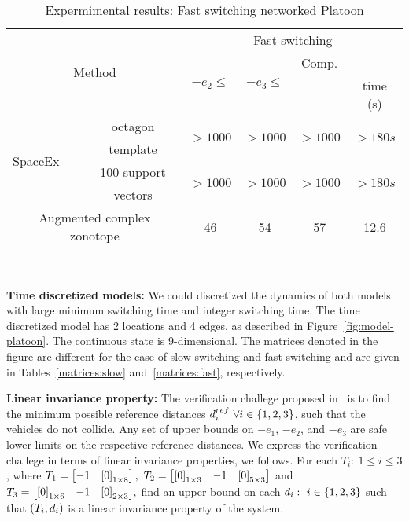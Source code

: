 \begin{table}
\begin{tabular}{|l|c|c|c|c|c|}
\hline
\multicolumn{2}{|c|}{\multirow{4}{*}{Method}} & \multicolumn{4}{|c|}{\multirow{2}{*}{Fast switching}}\\
\multicolumn{2}{|c|}{} & \multicolumn{4}{|c|}{}\\
\cline{3-6}
\multicolumn{2}{|c|}{} & \multirow{2}{*}{$-e_1\leq$} & \multirow{2}{*}{$-e_2\leq$} & \multirow{2}{*}{$-e_3\leq$} & Comp.\\
\multicolumn{2}{|c|}{} & & & & time (s)\\
\hline
\multirow{4}{*}{SpaceEx} & octagon & \multirow{2}{*}{$>1000$} &
\multirow{2}{*}{$>1000$} & \multirow{2}{*}{$>1000$} &
\multirow{2}{*}{$>180s$}\\
& template & & & &\\
\cline{2-6}
& 100 support & \multirow{2}{*}{$>1000$} & \multirow{2}{*}{$>1000$} &
\multirow{2}{*}{$>1000$} & \multirow{2}{*}{$>180s$}\\
& vectors & & & & \\
\hline
\multicolumn{2}{|c|}{\multirow{2}{*}{Augmented complex zonotope}} &
\multirow{2}{*}{46} & \multirow{2}{*}{54} &
\multirow{2}{*}{57} & \multirow{2}{*}{12.6}\\
\multicolumn{2}{|c|}{} & & & & \\
\hline
\end{tabular}
%
\caption{Expermimental results: Fast switching networked Platoon}~\label{tab:largedwell-platoon1}
\end{table}

{\bf Time discretized models: } We could discretized the dynamics of
both models with large minimum switching time and integer switching
time.  The time discretized model has 2 locations and 4 edges, as
described in Figure~\ref{fig:model-platoon}.  The continuous state is
9-dimensional.  The matrices denoted in the figure are different for
the case of slow switching and fast switching and are given in
Tables~\ref{matrices:slow} and~\ref{matrices:fast}, respectively.


{\bf Linear invariance property: } The verification challege proposed
in~\cite{makhlouf2014networked} is to find the minimum possible reference distances
$d_i^{ref}~\forall i\in\left\{1,2,3\right\}$, such that the vehicles do not
collide.  Any set of upper bounds on $-e_1$, $-e_2$, and $-e_3$ are
safe lower limits on the respective reference distances.  We express
the verification challege in terms of linear invariance properties, we
follows.  For each ${T_i:~1\leq
i\leq 3}$, where
%
$ T_1=\left[\begin{matrix}-1 & \left[0\right]_{1\times 8}\end{matrix}\right],~
T_2=\left[\begin{matrix}\left[0\right]_{1\times 3} & -1 &\left[0\right]_{5\times 3}\end{matrix}\right]$ and
 ${T_3=\left[\begin{matrix}\left[0\right]_{1\times 6}& -1 &\left[0\right]_{2\times 3}\end{matrix}\right]},
$
%
find an upper bound on each $d_i:~i\in\left\{1,2,3\right\}$ such that
$\left(T_i,d_i\right)$ is a linear invariance property of the system.

